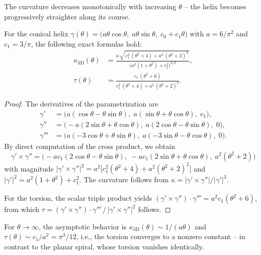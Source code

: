 The curvature decreases monotonically with increasing $\theta$ -- the helix
becomes progressively straighter along its course.

\begin{theorem}\label{satz:3d-kruemmung}
For the conical helix $\gamma(\theta) = \bigl(a\theta\cos\theta,\;
a\theta\sin\theta,\; c_0 + c_1\theta\bigr)$ with $a = 6/\pi^2$ and
$c_1 = 3/\pi$, the following exact formulas hold:
\begin{align}
\kappa_{\mathrm{3D}}(\theta)
  &= \frac{a\,\sqrt{\,c_1^2\,(\theta^2+4) + a^2\,(\theta^2+2)^2\,}}
          {\bigl(a^2(1+\theta^2) + c_1^2\bigr)^{3/2}},
\label{eq:kappa3d}\\[6pt]
\tau(\theta)
  &= \frac{c_1\,(\theta^2 + 6)}
          {c_1^2\,(\theta^2+4) + a^2\,(\theta^2+2)^2}.
\label{eq:torsion}
\end{align}
\end{theorem}

\begin{proof}
The derivatives of the parametrization are
\begin{align*}
\gamma'  &= \bigl(a(\cos\theta - \theta\sin\theta),\;
             a(\sin\theta + \theta\cos\theta),\; c_1\bigr),\\
\gamma'' &= \bigl(-a(2\sin\theta + \theta\cos\theta),\;
             a(2\cos\theta - \theta\sin\theta),\; 0\bigr),\\
\gamma'''&= \bigl(a(-3\cos\theta + \theta\sin\theta),\;
             a(-3\sin\theta - \theta\cos\theta),\; 0\bigr).
\end{align*}
By direct computation of the cross product, we obtain
\[
  \gamma' \times \gamma''
  = \bigl(-ac_1(2\cos\theta - \theta\sin\theta),\;
          -ac_1(2\sin\theta + \theta\cos\theta),\;
          a^2(\theta^2+2)\bigr)
\]
with magnitude $|\gamma' \times \gamma''|^2 = a^2\bigl[c_1^2(\theta^2+4) +
a^2(\theta^2+2)^2\bigr]$ and $|\gamma'|^2 = a^2(1+\theta^2) + c_1^2$.
The curvature follows from $\kappa = |\gamma' \times \gamma''|/|\gamma'|^3$.

For the torsion, the scalar triple product yields
$(\gamma' \times \gamma'') \cdot \gamma''' = a^2 c_1(\theta^2+6)$,
from which $\tau = (\gamma' \times \gamma'') \cdot \gamma''' \,/\,
|\gamma' \times \gamma''|^2$ follows.
\end{proof}

\begin{remark}
For $\theta \to \infty$, the asymptotic behavior is
$\kappa_{\mathrm{3D}}(\theta) \sim 1/(a\theta)$ and
$\tau(\theta) \sim c_1/a^2 = \pi^3/12$, i.e., the torsion
converges to a nonzero constant --
in contrast to the planar spiral, whose torsion vanishes identically.
\end{remark}

